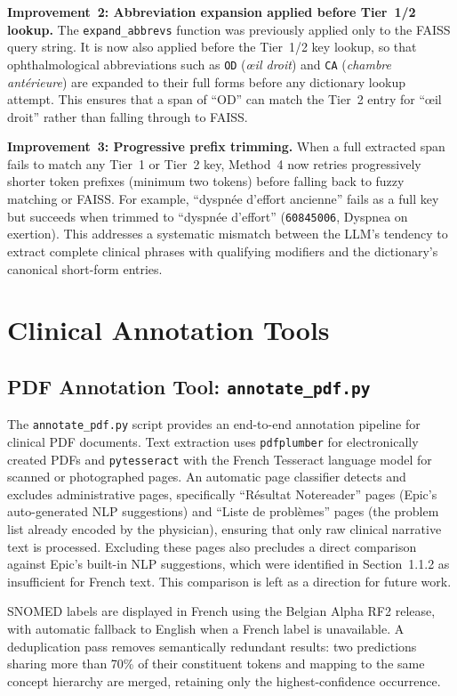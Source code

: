 \textbf{Improvement~2: Abbreviation expansion applied before Tier~1/2 lookup.} The \texttt{expand\_abbrevs} function was previously applied only to the FAISS query string. It is now also applied before the Tier~1/2 key lookup, so that ophthalmological abbreviations such as \texttt{OD} (\textit{œil droit}) and \texttt{CA} (\textit{chambre antérieure}) are expanded to their full forms before any dictionary lookup attempt. This ensures that a span of ``OD'' can match the Tier~2 entry for ``œil droit'' rather than falling through to FAISS.

\textbf{Improvement~3: Progressive prefix trimming.} When a full extracted span fails to match any Tier~1 or Tier~2 key, Method~4 now retries progressively shorter token prefixes (minimum two tokens) before falling back to fuzzy matching or FAISS. For example, ``dyspnée d'effort ancienne'' fails as a full key but succeeds when trimmed to ``dyspnée d'effort'' (\texttt{60845006}, Dyspnea on exertion). This addresses a systematic mismatch between the LLM's tendency to extract complete clinical phrases with qualifying modifiers and the dictionary's canonical short-form entries.

\section{Clinical Annotation Tools}

\subsection{PDF Annotation Tool: \texttt{annotate\_pdf.py}}

The \texttt{annotate\_pdf.py} script provides an end-to-end annotation pipeline for clinical PDF documents. Text extraction uses \texttt{pdfplumber} for electronically created PDFs and \texttt{pytesseract} with the French Tesseract language model for scanned or photographed pages. An automatic page classifier detects and excludes administrative pages, specifically ``Résultat Notereader'' pages (Epic's auto-generated NLP suggestions) and ``Liste de problèmes'' pages (the problem list already encoded by the physician), ensuring that only raw clinical narrative text is processed. Excluding these pages also precludes a direct comparison against Epic's built-in NLP suggestions, which were identified in Section~1.1.2 as insufficient for French text. This comparison is left as a direction for future work.

SNOMED labels are displayed in French using the Belgian Alpha RF2 release, with automatic fallback to English when a French label is unavailable. A deduplication pass removes semantically redundant results: two predictions sharing more than 70\% of their constituent tokens and mapping to the same concept hierarchy are merged, retaining only the highest-confidence occurrence.

